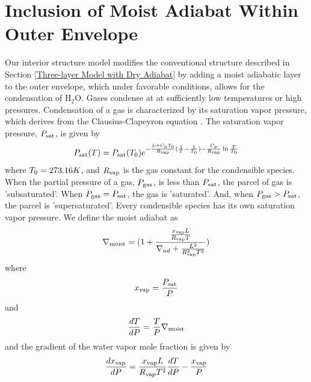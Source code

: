 \documentclass[11pt]{ucscthesisbs}
\begin{document}
\section{Inclusion of Moist Adiabat Within Outer Envelope}
Our interior structure model modifies the conventional structure described in Section \ref{Three-layer Model with Dry Adiabat} by adding a moist adiabatic layer to the outer envelope, which under favorable conditions, allows for the condensation of H$_{2}$O. Gases condense at at sufficiently low temperatures or high pressures. Condensation of a gas is characterized by its saturation vapor pressure, which derives from the Clausius-Clapeyron equation \citep{sanchez_2011}. The saturation vapor pressure, $P_{\rm sat}$, is given by 
\begin{equation}
  P_{\rm sat}(T) = P_{\rm sat}(T_{\rm 0})e^{-\frac{L + C_{\rm p}T_{\rm 0}}{R_{\rm vap}}(\frac{1}{T} - \frac{1}{T_{\rm 0}}) -\frac{C_{\rm p}}{R_{\rm vap}}\ln{\frac{T}{T_{\rm 0}}}}
  \label{eq:saturation_vapor_pressure}
\end{equation}
where $T_{\rm 0} = 273.16K$, and $R_{\rm vap}$ is the gas constant for the condensible species. When the partial pressure of a gas, $P_{\rm gas}$, is less than $P_{\rm sat}$, the parcel of gas is 'subsaturated'. When $P_{\rm gas} = P_{\rm sat}$, the gas is 'saturated'. And, when $P_{\rm gas} > P_{\rm sat}$, the parcel is 'supersaturated'. Every condensible species has its own saturation vapor pressure. We define the moist adiabat as \citep{sanchez_2011} 
\begin{equation}
  \nabla_{\rm moist} = (1 + \frac{\frac{x_{\rm vap} L}{R_{\rm vap}T}}{\nabla_{ad} + \frac{L^2}{R_{\rm vap}^2 T^2}} )
\end{equation}
where
\begin{equation}
x_{\rm vap} =\frac{P_{\rm sat}}{P}
\end{equation}
and
\begin{equation}
\frac{dT}{dP} =\frac{T}{P}\nabla_{\rm moist}
\end{equation}
and the gradient of the water vapor mole fraction is given by
\begin{equation}
\frac{d x_{\rm vap}}{dP} = \frac{x_{\rm vap} L}{R_{\rm vap} T^2} \frac{dT}{dP} - \frac{x_{\rm vap}}{P}
\end{equation}
\end{document}
